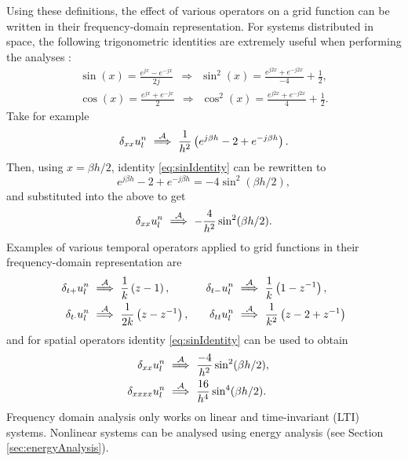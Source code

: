 {{%
Using these definitions, the effect of various operators on a grid function can be written in their frequency-domain representation. For systems distributed in space, the following trigonometric identities are extremely useful when performing the analyses \cite[p. 71]{Abramowitz1972}:
\begin{subequations}
    \begin{gather}
        \sin(x) = \frac{e^{jx} - e^{-jx}}{2j}\ \ \Rightarrow \ \ \sin^2(x) %
        = \frac{e^{j2x} + e^{-j2x}}{-4} + \frac{1}{2},\label{eq:sinIdentity}\\
        \cos(x) = \frac{e^{jx} + e^{-jx}}{2}\ \ \Rightarrow \ \ \cos^2(x) %
        = \frac{e^{j2x} + e^{-j2x}}{4} + \frac{1}{2}.\label{eq:cosIdentity}
    \end{gather}
\end{subequations}
Take for example
\begin{equation*}
    \delta_{xx} u_l^n \ \overset{\mathcal{A}}{\Longrightarrow}\  \frac{1}{h^2}\left(e^{j\beta h} - 2 + e^{-j\beta h}\right).
\end{equation*}
Then, using $x = \beta h / 2$, identity \eqref{eq:sinIdentity} can be rewritten to 
\begin{equation*}
    e^{j\beta h} - 2 + e^{-j\beta h} = -4 \sin^2(\beta h / 2),
\end{equation*}
and substituted into the above to get
\begin{equation*}
    \delta_{xx} u_l^n \ \overset{\mathcal{A}}{\Longrightarrow}\  -\frac{4}{h^2}\sin^2(\beta h /2).
\end{equation*}
Examples of various temporal operators applied to grid functions in their frequency-domain representation are
\begin{equation}\label{eq:temporalAnsatz}
    \begin{aligned}
    \delta_{t+} u_l^n &\ \overset{\mathcal{A}}{\Longrightarrow}\  \frac{1}{k} \left(z - 1\right),& \delta_{t-} u_l^n &\ \overset{\mathcal{A}}{\Longrightarrow}\  \frac{1}{k} \left(1 - z^{-1}\right),\\
    \delta_{t\cdot} u_l^n&\ \overset{\mathcal{A}}{\Longrightarrow}\  \dfrac{1}{2k} \left(z - z^{-1}\right), &\quad \delta_{tt} u_l^n&\ \overset{\mathcal{A}}{\Longrightarrow}\ \frac{1}{k^2} \left(z - 2 + z^{-1}\right)
    \end{aligned}
\end{equation}
and for spatial operators identity \eqref{eq:sinIdentity} can be used to obtain
\begin{subequations}
\begin{align}
    \delta_{xx}u_l^n&\ \overset{\mathcal{A}}{\Longrightarrow}\  \frac{-4}{h^2} \sin^2(\beta h / 2), \quad \label{eq:dxxAnsatz}\\
    \delta_{xxxx} u_l^n&\ \overset{\mathcal{A}}{\Longrightarrow}\ \frac{16}{h^4} \sin^4(\beta h / 2).\label{eq:dxxxxAnsatz}
\end{align}
\end{subequations}
Frequency domain analysis only works on linear and time-invariant (LTI) systems. Nonlinear systems can be analysed using energy analysis (see Section \ref{sec:energyAnalysis}).   

}}
